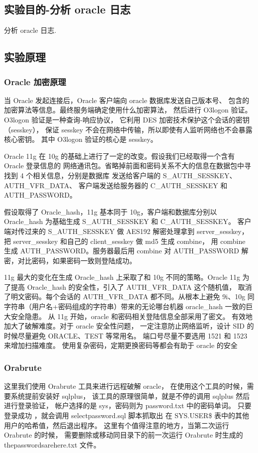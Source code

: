 \subsection{实验目的-分析 oracle 日志}
分析 oracle 日志.
%
\subsection{实验原理}
\subsubsection{Oracle 加密原理}
当 Oracle 发起连接后，Oracle 客户端向 oracle 数据库发送自己版本号、
包含的加密算法等信息。最终服务端确定使用什么加密算法，
然后进行 O3logon 验证。O3logon 验证是一种查询-响应协议，
它利用 DES 加密技术保护这个会话的密钥（sesskey），
保证 sesskey 不会在网络中传输，所以即使有人监听网络也不会暴露核心密钥。
其中 O3logon 验证的核心是 sesskey。

Oracle 11g 在 10g 的基础上进行了一定的改变。假设我们已经取得一个含有 Oracle 登录信息的
网络通讯包。省略掉前面和密码关系不大的信息在数据包中寻找到 4 个相关信息，分别是数据库
发送给客户端的 S\_AUTH\_SESSKEY、AUTH\_VFR\_DATA、
客户端发送给服务器的 C\_AUTH\_SESSKEY 和 AUTH\_PASSWORD。

假设取得了 Oracle\_hash，11g 基本同于 10g，客户端和数据库分别以 Oracle\_hash 为基础生成
S\_AUTH\_SESSKEY 和 C\_AUTH\_SESSKEY。
客户端对传过来的 S\_AUTH\_SESSKEY 做 AES192 解密处理拿到
server\_sesskey，把 server\_sesskey 和自己的 client\_sesskey 做 md5 生成 combine，
用 combine 生成 AUTH\_PASSWORD。服务器最后用 combine 对
AUTH\_PASSWORD 解密，对比密码，如果密码一致则登陆成功。

11g 最大的变化在生成 Oracle\_hash 上采取了和 10g 不同的策略。Oracle 11g 为了提高
Oracle\_hash 的安全性，引入了 AUTH\_VFR\_DATA 这个随机值，
取消了明文密码。每个会话的 AUTH\_VFR\_DATA 都不同。从根本上避免 9i、10g
同字符串（用户名+密码组成的字符串）带来的无论哪台机器
oracle\_hash 一致的巨大安全隐患。
从 11g 开始，oracle 和密码相关登陆信息全部采用了密文。
有效地加大了破解难度。对于 oracle 安全性问题，
一定注意防止网络监听，设计 SID 的时候尽量避免 ORACLE、TEST 等常用名。
端口号尽量不要选用 1521 和 1523 来增加扫描难度。
使用复杂密码，定期更换密码等都会有助于 oracle 的安全
%
\subsubsection{Orabrute}
这里我们使用 Orabrute 工具来进行远程破解 oracle，
在使用这个工具的时候，需要系统提前安装好 sqlplus，
该工具的原理很简单，就是不停的调用 sqlplus 然后进行登录验证，
帐户选择的是 sys，密码则为 password.txt 中的密码单词。
只要登录成功 ，就会调用 selectpassword.sql 脚本抓取出
在 SYS.USER\$ 表中的其他用户的哈希值，然后退出程序。
这里有个值得注意的地方，当第二次运行 Orabrute 的时候，
需要删除或移动同目录下的前一次运行 Orabrute 时生成的
thepasswordsarehere.txt 文件。
%
